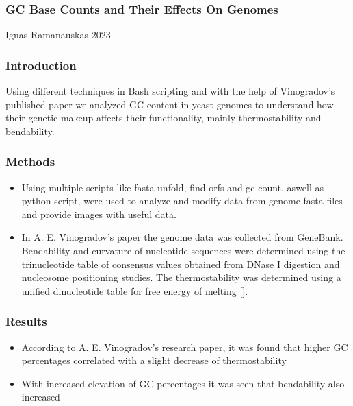 \documentclass{beamer}
\author{Ignas Ramanauskas}
\begin{document}
\begin{frame}
  \frametitle{GC Base Counts and Their Effects On Genomes}
  \footnotesize{Ignas Ramanauskas}
  \normalsize
  2023
\end{frame}

\begin{frame}
  \frametitle{Introduction}
  Using different techniques in Bash scripting and with the help of Vinogradov's published paper we analyzed GC content in yeast genomes to understand how their genetic makeup affects their functionality, mainly thermostability and bendability.
\end{frame}

\begin{frame}
  \frametitle{Methods}
  \begin{itemize}
      \item Using multiple scripts like fasta-unfold, find-orfs and gc-count, aswell as python script, were used to analyze and modify data from genome fasta files and provide images with useful data.
      \item In A. E. Vinogradov's paper the genome data was collected from GeneBank. Bendability and curvature of nucleotide sequences were determined using the trinucleotide table of consensus values obtained from DNase I digestion and nucleosome positioning studies. The thermostability was determined using a unified dinucleotide table for free energy of melting [\cite{Vinogradov2003}].
  \end{itemize}
  
\end{frame}

\begin{frame}
  \frametitle{Results}
  \begin{itemize}
      \item According to A. E. Vinogradov's research paper, it was found that higher GC percentages correlated with a slight decrease of thermostability
      \item With increased elevation of GC percentages it was seen that bendability also increased
      
  \end{itemize}
\end{frame}
\end{document}
